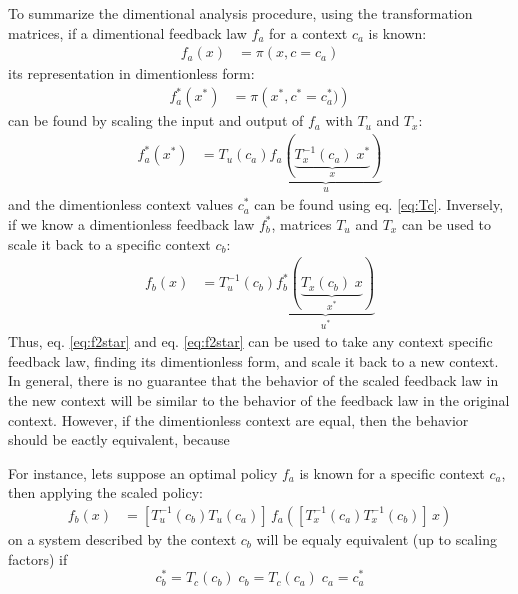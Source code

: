 To summarize the dimentional analysis procedure, using the transformation matrices, if a dimentional feedback law $f_a$ for a context $c_a$ is known:
\begin{align}
f_a ( x ) &= \pi \left( x, c = c_a \right)
\end{align}
its representation in dimentionless form:
\begin{align}
f_a^* ( x^* ) &= \pi \left( x^*, c^* = c_a^* )\right) 
\end{align}
can be found by scaling the input and output of $f_a$ with $T_u$ and $T_x$:
\begin{align}
f_a^* ( x^* ) &= T_u(c_a) 
\underbrace{
f_a \left(  
\underbrace{
T_x^{-1}(c_a) \; x^*
}_{x}
\right)
}_{u}
\label{eq:f2star}
\end{align}
and the dimentionless context values $c^*_a$ can be found using eq. \eqref{eq:Tc}.
Inversely, if we know a dimentionless feedback law $f_b^*$, matrices $T_u$ and $T_x$ can be used to scale it back to a specific context $c_b$:
\begin{align}
f_b ( x ) &= T^{-1}_u(c_b) 
\underbrace{
f_b^* \left(  
\underbrace{
T_x(c_b) \; x
}_{x^*}
\right)
}_{u^*}
\label{eq:star2f}
\end{align}
Thus, eq. \eqref{eq:f2star} and eq. \eqref{eq:f2star} can be used to take any context specific feedback law, finding its dimentionless form, and scale it back to a new context. In general, there is no guarantee that the behavior of the scaled feedback law in the new context will be similar to the behavior of the feedback law in the original context. However, if the dimentionless context are equal, then the behavior should be eactly equivalent, because 

For instance, lets suppose an optimal policy $f_a$ is known for a specific context $c_a$, then applying the scaled policy:
\begin{align}
f_b ( x ) &= 
\left[ T^{-1}_u(c_b) 
T_u(c_a) \right] \,
f_a \left( 
\left[
T_x^{-1}(c_a) 
T_x^{-1}(c_b)
\right] \,
x
\right)
\end{align}
on a system described by the context $c_b$ will be equaly equivalent (up to scaling factors) if 
\begin{equation}
c_b^* =  T_c( c_b ) \; c_b  = T_c( c_a ) \; c_a = c_a^* 
\end{equation}


